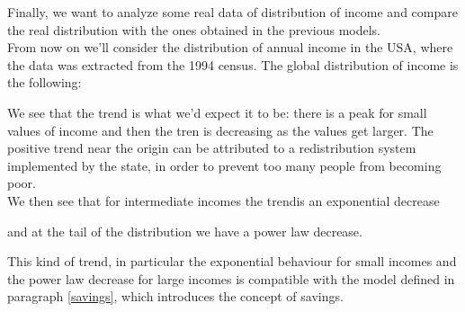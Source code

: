 Finally, we want to analyze some real data of distribution of income and compare the real distribution with the ones obtained in the previous models. \\
From now on we'll consider the distribution of annual income in the USA, where the data was extracted from the 1994 census. The global distribution of income is the following:
\begin{figure}[ht!]
    \centering
    \scalebox{.7}{}
    \caption{\emph{}}
    \label{fig:gloabl_realData}
\end{figure}
We see that the trend is what we'd expect it to be: there is a peak for small values of income and then the tren is decreasing as the values get larger. The positive trend near the origin can be attributed to a redistribution system implemented by the state, in order to prevent too many people from becoming poor. \\
We then see that for intermediate incomes the trendis an exponential decrease
\begin{figure}[ht!]
    \centering
    \scalebox{.7}{}
    \caption{\emph{}}
    \label{fig:real_head}
\end{figure}
 and at the tail of the distribution we have a power law decrease.
\begin{figure}[ht!]
    \centering
    \scalebox{.7}{}
    \caption{\emph{}}
    \label{fig:real_tail}
\end{figure}
This kind of trend, in particular the exponential behaviour for small incomes and the power law decrease for large incomes is compatible with the model defined in paragraph \ref{savings}, which introduces the concept of savings. 
\begin{figure}[ht!]
    \centering
    \scalebox{.7}{}
    \caption{\emph{}}
    \label{fig:gloabl_realData_head}
\end{figure}
\begin{figure}[ht!]
    \centering
    \scalebox{.7}{}
    \caption{\emph{}}
    \label{fig:gloabl_realData_tail}
\end{figure}
